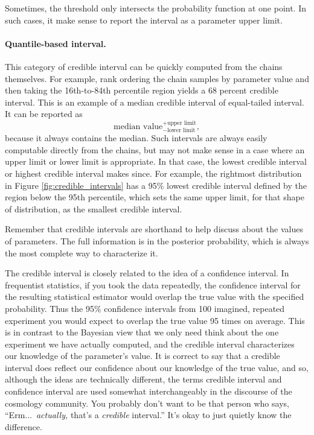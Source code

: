   Sometimes, the threshold only intersects the probability function at one point.  In such cases, it make sense to report the interval as a parameter upper limit.
  
\paragraph{Quantile-based interval.}  This category of credible interval can be quickly computed from the chains themselves.  For example, rank ordering the chain samples by parameter value and then taking the 16th-to-84th percentile region yields a 68 percent credible interval.  This is an example of a median credible interval of equal-tailed interval.  It can be reported as
$$ \mbox{median value}^{+\textrm{upper\ limit}}_{-\textrm{lower\ limit}}, $$
because it always contains the median.  Such intervals are always easily computable directly from the chains, but may not make sense in a case where an upper limit or lower limit is appropriate.  In that case, the lowest credible interval or highest credible interval makes since.  For example, the rightmost distribution in Figure \ref{fig:credible_intervals} has a 95\% lowest credible interval defined by the region below the 95th percentile, which sets the same upper limit, for that shape of distribution, as the smallest credible interval.

Remember that credible intervals are shorthand to help discuss about the values of parameters.  The full information is in the posterior probability, which is always the most complete way to characterize it.

The credible interval is closely related to the idea of a confidence interval.  In frequentist statistics, if you took the data repeatedly, the confidence interval for the resulting statistical estimator would overlap the true value with the specified probability.  Thus the 95\% confidence intervals from 100 imagined, repeated experiment you would expect to overlap the true value 95 times on average.  This is in contrast to the Bayesian view that we only need think about the one experiment we have actually computed, and the credible interval characterizes our knowledge of the parameter's value.  It is correct to say that a credible interval does reflect our confidence about our knowledge of the true value, and so, although the ideas are technically different, the terms credible interval and confidence interval are used somewhat interchangeably in the discourse of the cosmology community.  You probably don't want to be that person who says, ``Erm...\ \textit{actually,} that's a \textit{credible} interval.''  It's okay to just quietly know the difference.

